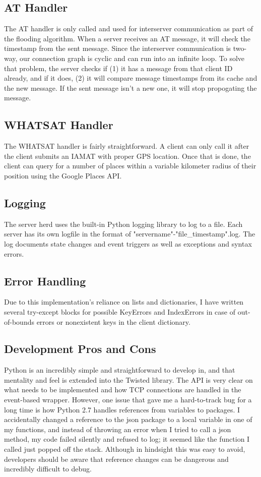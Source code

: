 \documentclass[letterpaper,twocolumn,10pt]{article}
\begin{document}
\subsection{AT Handler}
The AT handler is only called and used for interserver communication as part of the flooding algorithm. When a server receives an AT message, it will check the timestamp from the sent message. Since the interserver communication is two-way, our connection graph is cyclic and can run into an infinite loop. To solve that problem, the server checks if (1) it has a message from that client ID already, and if it does, (2) it will compare message timestamps from its cache and the new message. If the sent message isn't a new one, it will stop propogating the message. 

\subsection{WHATSAT Handler}
The WHATSAT handler is fairly straightforward. A client can only call it after the client submits an IAMAT with proper GPS location. Once that is done, the client can query for a number of places within a variable kilometer radius of their position using the Google Places API. 

\subsection{Logging}
The server herd uses the built-in Python logging library to log to a file. Each server has its own logfile in the format of "servername"-"file\_timestamp".log. The log documents state changes and event triggers as well as exceptions and syntax errors. 

\subsection{Error Handling}
Due to this implementation's reliance on lists and dictionaries, I have written several try-except blocks for possible KeyErrors and IndexErrors in case of out-of-bounds errors or nonexistent keys in the client dictionary.

\subsection{Development Pros and Cons}
Python is an incredibly simple and straightforward to develop in, and that mentality and feel is extended into the Twisted library. The API is very clear on what needs to be implemented and how TCP connections are handled in the event-based wrapper. However, one issue that gave me a hard-to-track bug for a long time is how Python 2.7 handles references from variables to packages. I accidentally changed a reference to the json package to a local variable in one of my functions, and instead of throwing an error when I tried to call a json method, my code failed silently and refused to log; it seemed like the function I called just popped off the stack. Although in hindsight this was easy to avoid, developers should be aware that reference changes can be dangerous and incredibly difficult to debug.
\end{document}
